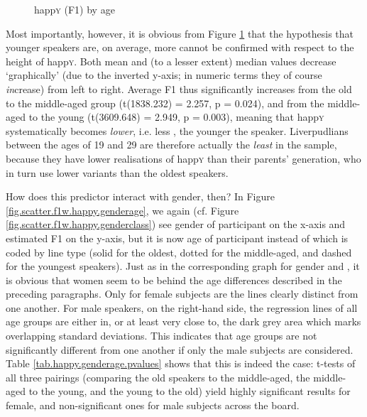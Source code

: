 \begin{figure}[h!]
	\centering
		\resizebox{0.5\linewidth}{!}{} 
		
	\caption{happ\textsc{y} (F1) by age}
	\label{fig.box.f1w.happy.tot}
\end{figure}

Most importantly, however, it is obvious from Figure \ref{fig.box.f1w.happy.tot} that the hypothesis that younger speakers are, on average, more  cannot be confirmed with respect to the height of happ\textsc{y}.
Both mean and (to a lesser extent) median values decrease `graphically' (due to the inverted y-axis; in numeric terms they of course \emph{in}crease) from left to right.
Average F1 thus significantly increases from the old to the middle-aged group (t(1838.232) = 2.257, p = 0.024), and from the middle-aged to the young (t(3609.648) = 2.949, p = 0.003), meaning that happ\textsc{y} systematically becomes \emph{lower}, i.e. less , the younger the speaker.
Liverpudlians between the ages of 19 and 29 are therefore actually the \emph{least}  in the sample, because they have lower realisations of happ\textsc{y} than their parents' generation, who in turn use lower variants than the oldest speakers.

How does this predictor interact with gender, then?
In Figure \ref{fig.scatter.f1w.happy.genderage}, we again (cf. Figure \ref{fig.scatter.f1w.happy.genderclass}) see gender of participant on the x-axis and estimated F1 on the y-axis, but it is now age of participant instead of  which is coded by line type (solid for the oldest, dotted for the middle-aged, and dashed for the youngest speakers).
Just as in the corresponding graph for gender and , it is obvious that women seem to be behind the age differences described in the preceding paragraphs.
Only for female subjects are the lines clearly distinct from one another.
For male speakers, on the right-hand side, the regression lines of all age groups are either in, or at least very close to, the dark grey area which marks overlapping standard deviations.
This indicates that age groups are not significantly different from one another if only the male subjects are considered.
Table \ref{tab.happy.genderage.pvalues} shows that this is indeed the case: t-tests of all three pairings (comparing the old speakers to the middle-aged, the middle-aged to the young, and the young to the old) yield highly significant results for female, and non-significant ones for male subjects across the board.

